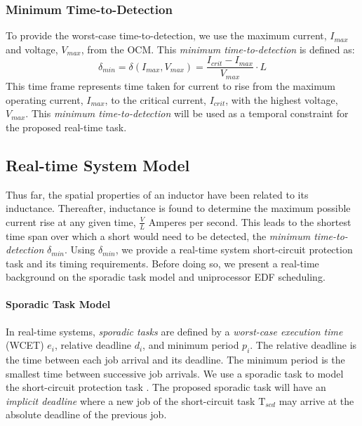 \subsubsection{Minimum Time-to-Detection}
To provide the worst-case time-to-detection, we use the maximum current, $I_{max}$ and voltage, $V_{max}$, from the OCM. This \textit{minimum time-to-detection} is defined as:
\begin{equation}\label{eq:MinTimeToDetect}
\delta_{min} = \delta(I_{max},V_{max}) = \frac{I_{crit}-I_{max}}{V_{max}}\cdot L
\end{equation}
This time frame represents time taken for current to rise from the maximum operating current, $I_{max}$, to the critical current, $I_{crit}$, with the highest voltage, $V_{max}$. This \textit{minimum time-to-detection} will be used as a temporal constraint for the proposed real-time task.
\clearpage \subsection{Real-time System Model}\label{subsec:real-time system model}
Thus far, the spatial properties of an inductor have been related to its inductance. Thereafter, inductance is found to determine the maximum possible current rise at any given time, $\frac{V}{L}$ Amperes per second. This leads to the shortest time span over which a short would need to be detected, the \textit{minimum time-to-detection} $\delta_{min}$. Using $\delta_{min}$, we provide a real-time system short-circuit protection task and its timing requirements. Before doing so, we present a real-time background on the sporadic task model and uniprocessor EDF scheduling.

\paragraph{Sporadic Task Model}
In real-time systems, \textit{sporadic tasks} are defined by a \textit{worst-case execution time} (WCET) $e_{i}$, relative deadline $d_{i}$, and minimum period $p_{i}$. The relative deadline is the time between each job arrival and its deadline. The minimum period is the smallest time between successive job arrivals. We use a sporadic task to model the short-circuit protection task \cite{mok_fundamental_1983}. The proposed sporadic task will have an \textit{implicit deadline} where a new job of the short-circuit task $\mathrm{T}_{scd}$ may arrive at the absolute deadline of the previous job.

